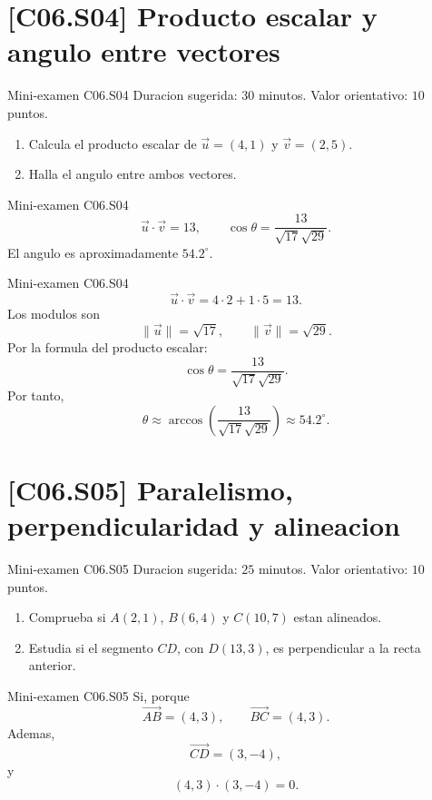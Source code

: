 \section{[C06.S04] Producto escalar y angulo entre vectores}

\begin{exambrief}{Mini-examen C06.S04}
Duracion sugerida: \(30\) minutos. Valor orientativo: \(10\) puntos.
\begin{enumerate}
  \item Calcula el producto escalar de \(\vec u=(4,1)\) y \(\vec v=(2,5)\).
  \item Halla el angulo entre ambos vectores.
\end{enumerate}
\end{exambrief}

\begin{shortanswer}{Mini-examen C06.S04}
\[
\vec u\cdot \vec v=13,
\qquad
\cos\theta=\frac{13}{\sqrt{17}\sqrt{29}}.
\]
El angulo es aproximadamente \(54.2^\circ\).
\end{shortanswer}

\begin{fullsolution}{Mini-examen C06.S04}
\[
\vec u\cdot \vec v=4\cdot 2+1\cdot 5=13.
\]
Los modulos son
\[
\|\vec u\|=\sqrt{17},
\qquad
\|\vec v\|=\sqrt{29}.
\]
Por la formula del producto escalar:
\[
\cos\theta=\frac{13}{\sqrt{17}\sqrt{29}}.
\]
Por tanto,
\[
\theta\approx \arccos\left(\frac{13}{\sqrt{17}\sqrt{29}}\right)\approx 54.2^\circ.
\]
\end{fullsolution}

\section{[C06.S05] Paralelismo, perpendicularidad y alineacion}

\begin{exambrief}{Mini-examen C06.S05}
Duracion sugerida: \(25\) minutos. Valor orientativo: \(10\) puntos.
\begin{enumerate}
  \item Comprueba si \(A(2,1)\), \(B(6,4)\) y \(C(10,7)\) estan alineados.
  \item Estudia si el segmento \(CD\), con \(D(13,3)\), es perpendicular a la recta anterior.
\end{enumerate}
\end{exambrief}

\begin{shortanswer}{Mini-examen C06.S05}
Si, porque
\[
\overrightarrow{AB}=(4,3),\qquad \overrightarrow{BC}=(4,3).
\]
Ademas,
\[
\overrightarrow{CD}=(3,-4),
\]
y
\[
(4,3)\cdot(3,-4)=0.
\]
\end{shortanswer}

